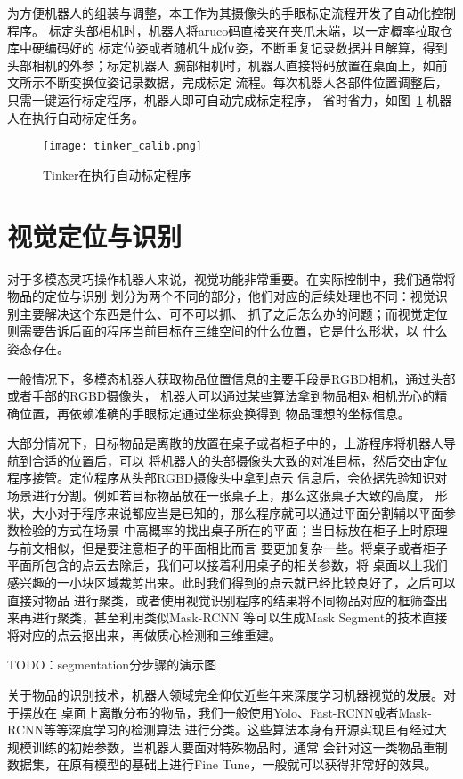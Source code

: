 为方便机器人的组装与调整，本工作为其摄像头的手眼标定流程开发了自动化控制程序。
标定头部相机时，机器人将aruco码直接夹在夹爪末端，以一定概率拉取仓库中硬编码好的
标定位姿或者随机生成位姿，不断重复记录数据并且解算，得到头部相机的外参；标定机器人
腕部相机时，机器人直接将码放置在桌面上，如前文所示不断变换位姿记录数据，完成标定
流程。每次机器人各部件位置调整后，只需一键运行标定程序，机器人即可自动完成标定程序，
省时省力，如图~\ref{fig:tinker_calib} 机器人在执行自动标定任务。

\begin{figure}[h] %
  \centering
  \texttt{[image: tinker\_calib.png]}
  \caption{Tinker在执行自动标定程序}
  \label{fig:tinker_calib}
\end{figure}


\section{视觉定位与识别}

对于多模态灵巧操作机器人来说，视觉功能非常重要。在实际控制中，我们通常将物品的定位与识别
划分为两个不同的部分，他们对应的后续处理也不同：视觉识别主要解决这个东西是什么、可不可以抓、
抓了之后怎么办的问题；而视觉定位则需要告诉后面的程序当前目标在三维空间的什么位置，它是什么形状，以
什么姿态存在。

一般情况下，多模态机器人获取物品位置信息的主要手段是RGBD相机，通过头部或者手部的RGBD摄像头，
机器人可以通过某些算法拿到物品相对相机光心的精确位置，再依赖准确的手眼标定通过坐标变换得到
物品理想的坐标信息。

大部分情况下，目标物品是离散的放置在桌子或者柜子中的，上游程序将机器人导航到合适的位置后，可以
将机器人的头部摄像头大致的对准目标，然后交由定位程序接管。定位程序从头部RGBD摄像头中拿到点云
信息后，会依据先验知识对场景进行分割。例如若目标物品放在一张桌子上，那么这张桌子大致的高度，
形状，大小对于程序来说都应当是已知的，那么程序就可以通过平面分割辅以平面参数检验的方式在场景
中高概率的找出桌子所在的平面；当目标放在柜子上时原理与前文相似，但是要注意柜子的平面相比而言
要更加复杂一些。将桌子或者柜子平面所包含的点云去除后，我们可以接着利用桌子的相关参数，将
桌面以上我们感兴趣的一小块区域裁剪出来。此时我们得到的点云就已经比较良好了，之后可以直接对物品
进行聚类，或者使用视觉识别程序的结果将不同物品对应的框筛查出来再进行聚类，甚至利用类似Mask-RCNN
等可以生成Mask Segment的技术直接将对应的点云抠出来，再做质心检测和三维重建。

TODO：segmentation分步骤的演示图

关于物品的识别技术，机器人领域完全仰仗近些年来深度学习机器视觉的发展。对于摆放在
桌面上离散分布的物品，我们一般使用Yolo、Fast-RCNN或者Mask-RCNN等等深度学习的检测算法
进行分类。这些算法本身有开源实现且有经过大规模训练的初始参数，当机器人要面对特殊物品时，通常
会针对这一类物品重制数据集，在原有模型的基础上进行Fine Tune，一般就可以获得非常好的效果。

